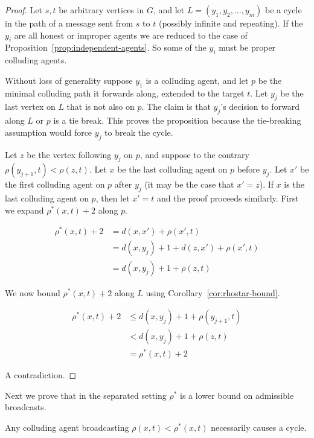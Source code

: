 \documentclass[prodmode,acmec]{ec-acmsmall}
\begin{document}
\begin{proof}

Let $s,t$ be arbitrary vertices in $G$, and let $L = (y_1, y_2, ..., y_m)$ be a
cycle in the path of a message sent from $s$ to $t$ (possibly infinite and
repeating). If the $y_i$ are all honest or improper agents we are reduced to
the case of Proposition~\ref{prop:independent-agents}. So some of the $y_i$
must be proper colluding agents. 

Without loss of generality suppose $y_1$ is a colluding agent, and let $p$ be
the minimal colluding path it forwards along, extended to the target $t$.  Let
$y_j$ be the last vertex on $L$ that is not also on $p$. The claim is that
$y_j$'s decision to forward along $L$ or $p$ is a tie break. This proves the
proposition because the tie-breaking assumption would force $y_j$ to break the
cycle.

Let $z$ be the vertex following $y_j$ on $p$, and suppose to the contrary
$\rho(y_{j+1}, t) < \rho(z,t)$. Let $x$ be the last colluding agent on $p$
before $y_j$. Let $x'$ be the first colluding agent on $p$ after $y_j$ (it may
be the case that $x' = z$). If $x$ is the last colluding agent on $p$, then let
$x'=t$ and the proof proceeds similarly. First we expand $\rho^*(x,t) + 2$
along $p$.

\begin{align*}
   \rho^*(x,t) + 2 &= d(x,x') + \rho(x',t) \\  
                   &= d(x,y_j) + 1 + d(z,x') + \rho(x',t) \\
                   &= d(x,y_j) + 1 + \rho(z,t)
\end{align*}

We now bound $\rho^*(x,t) + 2$ along $L$ using
Corollary~\ref{cor:rhostar-bound}. 

\begin{align*}
   \rho^*(x,t) + 2 &\leq d(x, y_j) + 1 + \rho(y_{j+1}, t) \\  
                   &< d(x, y_j) + 1 + \rho(z,t) \\ 
                   &= \rho^*(x,t) + 2
\end{align*}

A contradiction.
\end{proof}

Next we prove that in the separated setting $\rho^*$ is a lower bound on
admissible broadcasts. 

\begin{proposition} \label{prop:rhostar-lower-bound}

Any colluding agent broadcasting $\rho(x,t) < \rho^*(x,t)$ necessarily causes a
cycle.

\end{proposition}
\end{document}
